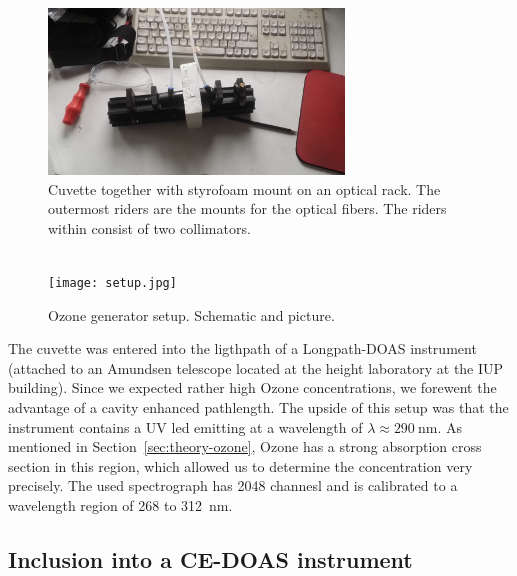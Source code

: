 \begin{figure}[htbp]
  \centering
  \includegraphics[width=0.7\textwidth]{images/cuvette.jpg}
  \caption{Cuvette together with styrofoam mount on an optical
    rack. The outermost riders are the mounts for the optical
    fibers. The riders within consist of two collimators.}
  \label{fig:cuvette}
\end{figure}

\begin{figure}[htbp]
  \centering
  {
  \def\svgwidth{0.9\linewidth}
  
  }
  \phantom{h}\\
  \bigskip
  \texttt{[image: setup.jpg]}
  \caption{Ozone generator setup. Schematic and picture.}
  \label{fig:setup}
\end{figure}

The cuvette was entered into the ligthpath of a Longpath-DOAS
instrument (attached to an Amundsen telescope located at the height
laboratory at the IUP building). Since we expected rather high Ozone
concentrations, we forewent the advantage of a cavity enhanced
pathlength. The upside of this setup was that the instrument contains
a UV led emitting at a wavelength of $\lambda \approx
\SI{290}{\nano\meter}$. As mentioned in
Section~\ref{sec:theory-ozone}, Ozone has a strong absorption cross
section in this region, which allowed us to determine the
concentration very precisely.  The used spectrograph has 2048 channesl
and is calibrated to a wavelength region of \num{268} to
\SI{312}{\nano\meter}.

\subsection{Inclusion into a CE-DOAS instrument}
\label{sec:inclusion}

